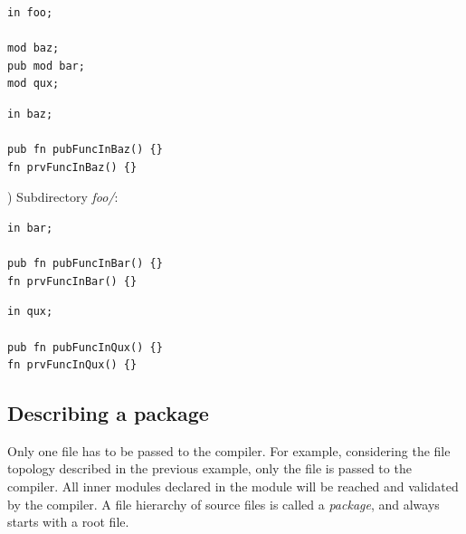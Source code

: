 \vspace{-5pt}%
\begin{minipage}[t][][t]{0.47\linewidth}
\begin{lstlisting}[caption=\textit{./foo.yr}, style=coloredverbatim]
in foo;

mod baz;
pub mod bar;
mod qux;

\end{lstlisting}
\end{minipage}\hspace{5pt}%
\begin{minipage}[t][][t]{0.47\linewidth}
\begin{lstlisting}[caption=\textit{./baz.yr}, style=coloredverbatim]
in baz;

pub fn pubFuncInBaz() {}
fn prvFuncInBaz() {}
\end{lstlisting}
\end{minipage}


) Subdirectory \textit{foo/}:

\vspace{-5pt}%
\begin{minipage}[t][][t]{0.47\linewidth}
\begin{lstlisting}[caption=\textit{./foo/bar.yr}, style=coloredverbatim]
in bar;

pub fn pubFuncInBar() {}
fn prvFuncInBar() {}
\end{lstlisting}
\end{minipage}\hspace{5pt}%
\begin{minipage}[t][][t]{0.47\linewidth}
\begin{lstlisting}[caption=\textit{./foo/qux.yr}, style=coloredverbatim]
in qux;

pub fn pubFuncInQux() {}
fn prvFuncInQux() {}
\end{lstlisting}
\end{minipage}

\subsection{Describing a package}

Only one file has to be passed to the compiler. For example, considering the
file topology described in the previous example, only the  file
is passed to the compiler. All inner modules declared in the  module
will be reached and validated by the compiler. A file hierarchy of source files
is called a \emph{package}, and always starts with a root file.

